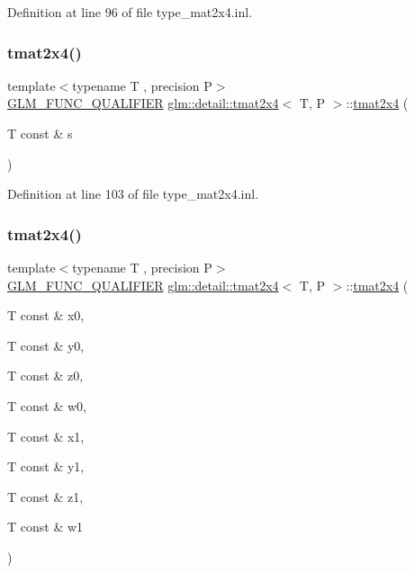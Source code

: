 Definition at line 96 of file type\+\_\+mat2x4.\+inl.

\mbox{\label{structglm_1_1detail_1_1tmat2x4_a3226371920e32b8cc562b6325f19d0f5}} 
\subsubsection{\texorpdfstring{tmat2x4()}{tmat2x4()}\hspace{0.1cm}{\footnotesize\ttfamily [5/22]}}
{\footnotesize\ttfamily template$<$typename T , precision P$>$ \\
\hyperlink{setup_8hpp_a33fdea6f91c5f834105f7415e2a64407}{G\+L\+M\+\_\+\+F\+U\+N\+C\+\_\+\+Q\+U\+A\+L\+I\+F\+I\+ER} \hyperlink{structglm_1_1detail_1_1tmat2x4}{glm\+::detail\+::tmat2x4}$<$ T, P $>$\+::\hyperlink{structglm_1_1detail_1_1tmat2x4}{tmat2x4} (\begin{DoxyParamCaption}\item[{T const \&}]{s }\end{DoxyParamCaption})\hspace{0.3cm}{\ttfamily [explicit]}}



Definition at line 103 of file type\+\_\+mat2x4.\+inl.

\mbox{\label{structglm_1_1detail_1_1tmat2x4_abc1d0f89ff3055acdb275ef0ef3904bd}} 
\subsubsection{\texorpdfstring{tmat2x4()}{tmat2x4()}\hspace{0.1cm}{\footnotesize\ttfamily [6/22]}}
{\footnotesize\ttfamily template$<$typename T , precision P$>$ \\
\hyperlink{setup_8hpp_a33fdea6f91c5f834105f7415e2a64407}{G\+L\+M\+\_\+\+F\+U\+N\+C\+\_\+\+Q\+U\+A\+L\+I\+F\+I\+ER} \hyperlink{structglm_1_1detail_1_1tmat2x4}{glm\+::detail\+::tmat2x4}$<$ T, P $>$\+::\hyperlink{structglm_1_1detail_1_1tmat2x4}{tmat2x4} (\begin{DoxyParamCaption}\item[{T const \&}]{x0,  }\item[{T const \&}]{y0,  }\item[{T const \&}]{z0,  }\item[{T const \&}]{w0,  }\item[{T const \&}]{x1,  }\item[{T const \&}]{y1,  }\item[{T const \&}]{z1,  }\item[{T const \&}]{w1 }\end{DoxyParamCaption})}



